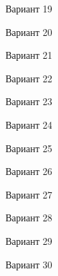 \begin{figure}[H]
    \centerline{}
    \caption{Вариант 19}
\end{figure}

\begin{figure}[H]
    \centerline{}
    \caption{Вариант 20}
\end{figure}

\begin{figure}[H]
    \centerline{}
    \caption{Вариант 21}
\end{figure}

\begin{figure}[H]
    \centerline{}
    \caption{Вариант 22}
\end{figure}

\begin{figure}[H]
    \centerline{}
    \caption{Вариант 23}
\end{figure}

\begin{figure}[H]
    \centerline{}
    \caption{Вариант 24}
\end{figure}

\begin{figure}[H]
    \centerline{}
    \caption{Вариант 25}
\end{figure}

\begin{figure}[H]
    \centerline{}
    \caption{Вариант 26}
\end{figure}

\begin{figure}[H]
    \centerline{}
    \caption{Вариант 27}
\end{figure}

\begin{figure}[H]
    \centerline{}
    \caption{Вариант 28}
\end{figure}

\begin{figure}[H]
    \centerline{}
    \caption{Вариант 29}
\end{figure}

\begin{figure}[H]
    \centerline{}
    \caption{Вариант 30}
\end{figure}

